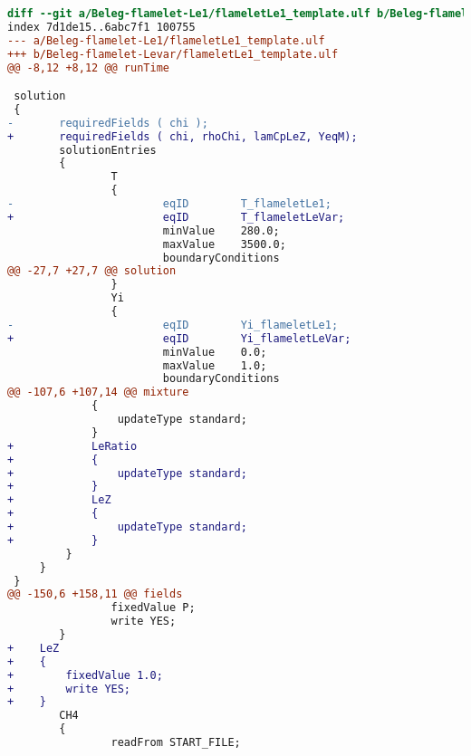 \begin{lstlisting}[language=diff, label=lst:flameletLeVar, caption=Ausgabe von \lstinline!git diff Beleg-flamelet-Levar/flameletLe1_template.ulf Beleg-flamelet-Levar/flameletLe1_template.ulf!]
diff --git a/Beleg-flamelet-Le1/flameletLe1_template.ulf b/Beleg-flamelet-Levar/flameletLe1_template.ulf
index 7d1de15..6abc7f1 100755
--- a/Beleg-flamelet-Le1/flameletLe1_template.ulf
+++ b/Beleg-flamelet-Levar/flameletLe1_template.ulf
@@ -8,12 +8,12 @@ runTime

 solution
 {
-       requiredFields ( chi );
+       requiredFields ( chi, rhoChi, lamCpLeZ, YeqM);
        solutionEntries
        {
                T
                {
-                       eqID        T_flameletLe1;
+                       eqID        T_flameletLeVar;
                        minValue    280.0;
                        maxValue    3500.0;
                        boundaryConditions
@@ -27,7 +27,7 @@ solution
                }
                Yi
                {
-                       eqID        Yi_flameletLe1;
+                       eqID        Yi_flameletLeVar;
                        minValue    0.0;
                        maxValue    1.0;
                        boundaryConditions
@@ -107,6 +107,14 @@ mixture
             {
                 updateType standard;
             }
+            LeRatio
+            {
+                updateType standard;
+            }
+            LeZ
+            {
+                updateType standard;
+            }
         }
     }
 }
@@ -150,6 +158,11 @@ fields
                fixedValue P;
                write YES;
        }
+    LeZ
+    {
+        fixedValue 1.0;
+        write YES;
+    }
        CH4
        {
                readFrom START_FILE;
\end{lstlisting}
